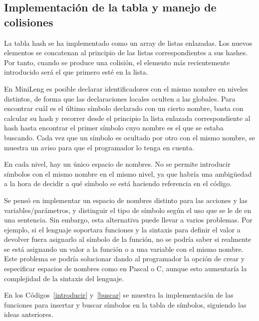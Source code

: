 \subsection{Implementación de la tabla y manejo de colisiones}
%
La tabla hash se ha implementado como un array de listas enlazadas. Los nuevos elementos se concatenan al principio de las listas correspondientes a sus hashes. Por tanto, cuando se produce una colisión, el elemento más recientemente introducido será el que primero esté en la lista.

En MiniLeng es posible declarar identificadores con el mismo nombre en niveles distintos, de forma que las declaraciones locales oculten a las globales. Para encontrar cuál es el último símbolo declarado con un cierto nombre, basta con calcular su hash y recorrer desde el principio la lista enlazada correspondiente al hash hasta encontrar el primer símbolo cuyo nombre es el que se estaba buscando. Cada vez que un símbolo es ocultado por otro con el mismo nombre, se muestra un aviso para que el programador lo tenga en cuenta.

En cada nivel, hay un único espacio de nombres. No se permite introducir símbolos con el mismo nombre en el mismo nivel, ya que habría una ambigüedad a la hora de decidir a qué símbolo se está haciendo referencia en el código.

Se pensó en implementar un espacio de nombres distinto para las acciones y las variables/parámetros, y distinguir el tipo de símbolo según el uso que se le de en una sentencia. Sin embargo, esta alternativa puede llevar a varios problemas. Por ejemplo, si el lenguaje soportara funciones y la sintaxis para definir el valor a devolver fuera asignarlo al símbolo de la función, no se podría saber si realmente se está asignando un valor a la función o a una variable con el mismo nombre. Este problema se podría solucionar dando al programador la opción de crear y especificar espacios de nombres como en Pascal o C, aunque esto aumentaría la complejidad de la sintaxis del lenguaje.

En los Códigos~\ref{introducir} y~\ref{buscar} se muestra la implementación de las funciones para insertar y buscar símbolos en la tabla de símbolos, siguiendo las ideas anteriores.

